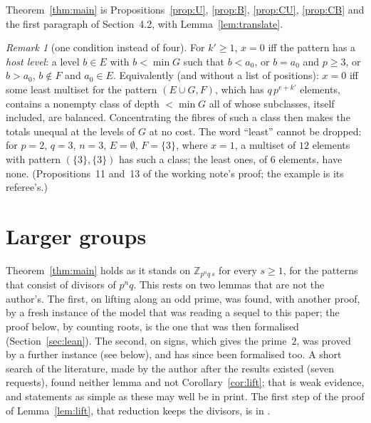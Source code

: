 \documentclass[11pt,a4paper]{amsart}
\theoremstyle{definition}
\theoremstyle{remark}
\newtheorem{remark}[theorem]{Remark}
\newcommand{\Z}{\mathbb{Z}}
\begin{document}
Theorem~\ref{thm:main} is Propositions~\ref{prop:U}, \ref{prop:B}, \ref{prop:CU}, \ref{prop:CB} and the first paragraph of Section~4.2, with Lemma~\ref{lem:translate}.

\begin{remark}[one condition instead of four]
For $k'\ge1$, $x=0$ iff the pattern has a \emph{host level}: a level $b\in E$ with $b<\min G$ such that
$b<a_0$, or $b=a_0$ and $p\ge3$, or $b>a_0$, $b\notin F$ and $a_0\in E$. Equivalently (and without a list of
positions): $x=0$ iff some least multiset for the pattern $(E\cup G,F)$, which has $q\,p^{e+k'}$ elements,
contains a nonempty class of depth $<\min G$ all of whose subclasses, itself included, are balanced. Concentrating the fibres
of such a class then makes the totals unequal at the levels of $G$ at no cost. The word ``least'' cannot be dropped: for $p=2$, $q=3$, $n=3$, $E=\emptyset$, $F=\{3\}$, where $x=1$, a multiset of $12$ elements with pattern $(\{3\},\{3\})$ has such a class; the least ones, of $6$ elements, have none. (Propositions~11 and~13 of the working note's proof; the example is its referee's.)
\end{remark}

\section{Larger groups}\label{sec:lift}

Theorem~\ref{thm:main} holds as it stands on $\Z_{p^nq\,s}$ for every $s\ge1$, for the patterns that consist of
divisors of $p^nq$. This rests on two lemmas that are not the author's. The first, on lifting along an odd prime, was found, with another proof, by a fresh instance of the model that
was reading a sequel to this paper; the proof below, by counting roots, is the one that was then formalised (Section~\ref{sec:lean}).
The second, on signs, which gives the prime~$2$, was proved by a further instance (see below), and has since been formalised too.
A short search of the literature, made by the author after the results existed (seven requests), found neither lemma and not
Corollary~\ref{cor:lift}; that is weak evidence, and statements as simple as these may well be in print. The first step of the
proof of Lemma~\ref{lem:lift}, that reduction keeps the divisors, is in \cite[Section~2.2]{KLaMS}.
\end{document}
